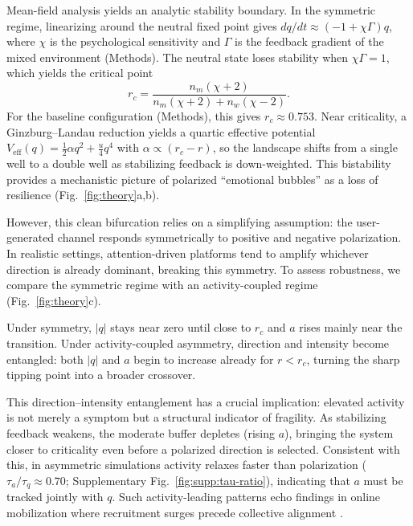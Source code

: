 \documentclass[11pt]{article}
\begin{document}
Mean-field analysis yields an analytic stability boundary. In the symmetric regime, linearizing around the neutral fixed point gives $dq/dt\approx(-1+\chi\Gamma)q$, where $\chi$ is the psychological sensitivity and $\Gamma$ is the feedback gradient of the mixed environment (Methods). The neutral state loses stability when $\chi\Gamma=1$, which yields the critical point
\begin{equation}
r_c=\frac{n_m(\chi+2)}{n_m(\chi+2)+n_w(\chi-2)}.
\label{eq:rc}
\end{equation}
For the baseline configuration (Methods), this gives $r_c\approx 0.753$. Near criticality, a Ginzburg--Landau reduction yields a quartic effective potential $V_{\text{eff}}(q)=\tfrac{1}{2}\alpha q^2+\tfrac{u}{4}q^4$ with $\alpha\propto(r_c-r)$, so the landscape shifts from a single well to a double well as stabilizing feedback is down-weighted. This bistability provides a mechanistic picture of polarized ``emotional bubbles'' as a loss of resilience (Fig.~\ref{fig:theory}a,b).

However, this clean bifurcation relies on a simplifying assumption: the user-generated channel responds symmetrically to positive and negative polarization. In realistic settings, attention-driven platforms tend to amplify whichever direction is already dominant, breaking this symmetry. To assess robustness, we compare the symmetric regime with an activity-coupled regime (Fig.~\ref{fig:theory}c).

Under symmetry, $|q|$ stays near zero until close to $r_c$ and $a$ rises mainly near the transition. Under activity-coupled asymmetry, direction and intensity become entangled: both $|q|$ and $a$ begin to increase already for $r<r_c$, turning the sharp tipping point into a broader crossover.

This direction--intensity entanglement has a crucial implication: elevated activity is not merely a symptom but a structural indicator of fragility. As stabilizing feedback weakens, the moderate buffer depletes (rising $a$), bringing the system closer to criticality even before a polarized direction is selected. Consistent with this, in asymmetric simulations activity relaxes faster than polarization ($\tau_a/\tau_q\approx 0.70$; Supplementary Fig.~\ref{fig:supp:tau-ratio}), indicating that $a$ must be tracked jointly with $q$. Such activity-leading patterns echo findings in online mobilization where recruitment surges precede collective alignment \citep{GonzalezBailon2011,SteinertThrelkeld2015}.
\end{document}
